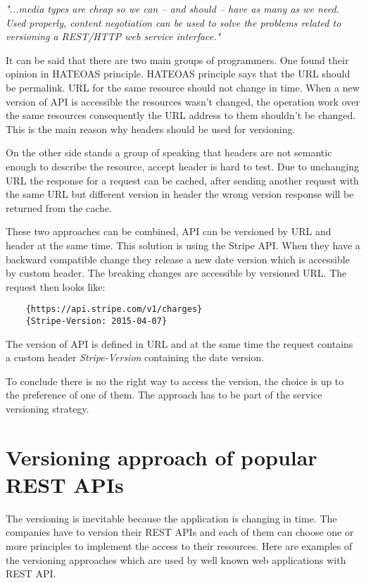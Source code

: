 \emph{"...media types are cheap so we can – and should – have as many as we need. Used properly, content negotiation can be used to solve the problems related to versioning a REST/HTTP web service interface."\cite{website:versioning-rest-web-services}}

\bigskip

It can be said that there are two main groups of programmers. One found their opinion in HATEOAS principle. HATEOAS principle says that the URL should be permalink. URL for the same resource should not change in time. When a new version of API is accessible the resources wasn't changed, the operation work over the same resources consequently the URL address to them shouldn't be changed. This is the main reason why headers should be used for versioning. 

On the other side stands a group of speaking that headers are not semantic enough to describe the resource, accept header is hard to test. Due to unchanging URL the response for a request can be cached, after sending another request with the same URL but different version in header the wrong version response will be returned from the cache.

\bigskip

These two approaches can be combined, API can be versioned by URL and header at the same time. This solution is using the Stripe API. When they have a backward compatible change they release a new date version which is accessible by custom header. The breaking changes are accessible by versioned URL. The request then looks like: 

\begin{lstlisting}
    {https://api.stripe.com/v1/charges}
    {Stripe-Version: 2015-04-07}
\end{lstlisting}

The version of API is defined in URL and at the same time the request contains a custom header \emph{Stripe-Version} containing the date version.

To conclude there is no the right way to access the version, the choice is up to the preference of one of them. The approach has to be part of the service versioning strategy.

\section{Versioning approach of popular REST APIs}
The versioning is inevitable because the application is changing in time. The companies have to version their REST APIs and each of them can choose one or more principles to implement the access to their resources. 
Here are examples of the versioning approaches which are used by well known web applications with REST API. \cite{website:restapi-example}


